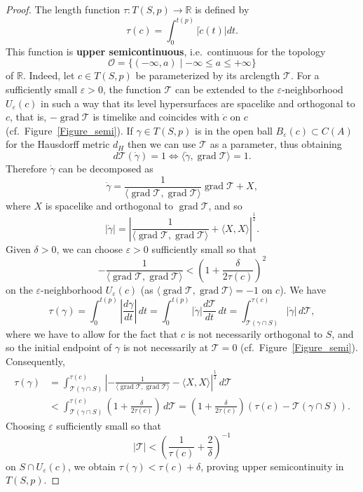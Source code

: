 \documentclass[12pt]{amsart}
\newcommand{\bbR}{\mathbb{R}}      %
\newcommand{\grad}{\operatorname{grad}}
\newcommand{\cT}{\mathcal{T}}
\theoremstyle{definition}
\theoremstyle{remark}
\begin{document}
\begin{proof}
The length function $\tau:T(S,p) \to \bbR$ is defined by
\[
\tau(c)=\int_0^{t(p)} |\dot{c}(t)| dt.
\]
This function is {\bf upper semicontinuous}, i.e.~continuous for the topology 
\[
\mathcal{O}=\{(-\infty,a) \mid -\infty \leq a \leq +\infty \}
\]
of $\bbR$. Indeed, let $c \in T(S,p)$ be parameterized by its arclength $\cT$. For a sufficiently small $\varepsilon > 0$, the function $\cT$ can be extended to the $\varepsilon$-neighborhood $U_{\varepsilon}(c)$ in such a way that its level hypersurfaces are spacelike and orthogonal to $c$, that is, $-\grad \cT$ is timelike and coincides with $\dot{c}$ on $c$ (cf.~Figure~\ref{Figure_semi}). If $\gamma \in T(S,p)$ is in the open ball $B_\varepsilon(c) \subset C(A)$ for the Hausdorff metric $d_H$ then we can use $\cT$ as a parameter, thus obtaining
\[
d\cT(\dot{\gamma}) = 1 \Leftrightarrow \langle \dot{\gamma}, \grad \cT \rangle = 1.
\]
Therefore $\dot{\gamma}$ can be decomposed as
\[
\dot{\gamma} = \frac1{\langle \grad \cT, \grad \cT \rangle} \grad \cT + X,
\]  
where $X$ is spacelike and orthogonal to $\grad \cT$, and so
\[
|\dot{\gamma}| = \left| \frac1{\langle \grad \cT, \grad \cT \rangle} + \langle X,X \rangle \right|^\frac12.
\]
Given $\delta > 0$, we can choose $\varepsilon>0$ sufficiently small so that
\[
-\frac1{\langle \grad \cT, \grad \cT \rangle} < \left(1 + \frac{\delta}{2\tau(c)}\right)^2
\]
on the $\varepsilon$-neighborhood $U_{\varepsilon}(c)$ (as $\langle \grad \cT, \grad \cT \rangle=-1$ on $c$). We have
\[
\tau(\gamma) =  \int_0^{t(p)} \left|\frac{d \gamma}{dt} \right| \, dt = \int_0^{t(p)} |\dot{\gamma}| \frac{d\cT}{dt} \, dt = \int_{\cT(\gamma\cap S)}^{\tau(c)} |\dot{\gamma}| \, d \cT,
\]
where we have to allow for the fact that $c$ is not necessarily orthogonal to $S$, and so the initial endpoint of $\gamma$ is not necessarily at $\cT=0$ (cf.~Figure~\ref{Figure_semi}). Consequently,
\begin{align*}
\tau(\gamma) & = \int_{\cT(\gamma\cap S)}^{\tau(c)} \left| -\frac1{\langle \grad \cT, \grad \cT \rangle} - \langle X,X \rangle \right|^\frac12 \, d \cT \\
& < \int_{\cT(\gamma\cap S)}^{\tau(c)} \left(1 + \frac{\delta}{2\tau(c)}\right) \, d \cT  = \left(1 + \frac{\delta}{2\tau(c)}\right) \left(\tau(c) - \cT(\gamma\cap S)\right).
\end{align*}
Choosing $\varepsilon$ sufficiently small so that 
\[
|\cT|< \left( \frac1{\tau(c)} + \frac{2}{\delta} \right)^{-1}
\]
on $S \cap U_{\varepsilon}(c)$, we obtain $\tau(\gamma) < \tau(c) + \delta$, proving upper semicontinuity in $T(S,p)$.


\end{proof}
\end{document}
